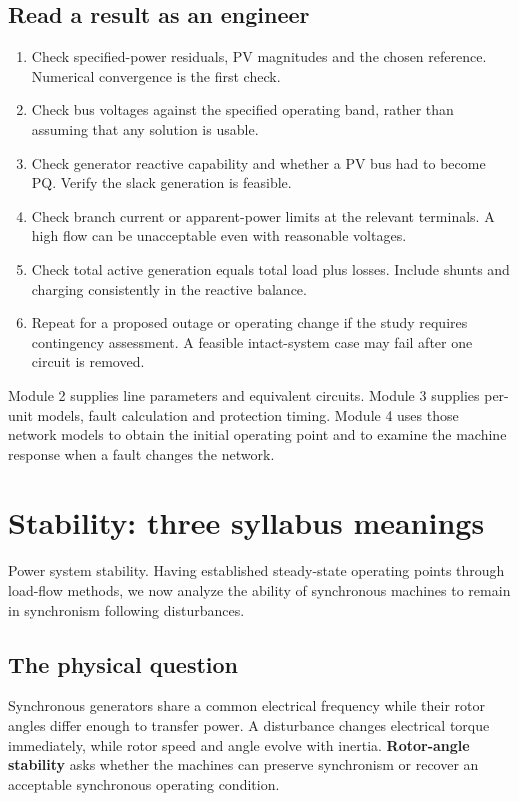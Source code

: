 \documentclass[11pt,a4paper]{article}
\newenvironment{Idea}[1]{\begin{tcolorbox}[colback=pale,colframe=teal,coltitle=white,title={#1}]}{\end{tcolorbox}}
\newcommand{\chapterstart}[2]{\par\needspace{12\baselineskip}\section{#1}\label{#2}}
\begin{document}
\subsection{Read a result as an engineer}
\begin{enumerate}
\item Check specified-power residuals, PV magnitudes and the chosen reference. Numerical convergence is the first check.
\item Check bus voltages against the specified operating band, rather than assuming that any solution is usable.
\item Check generator reactive capability and whether a PV bus had to become PQ. Verify the slack generation is feasible.
\item Check branch current or apparent-power limits at the relevant terminals. A high flow can be unacceptable even with reasonable voltages.
\item Check total active generation equals total load plus losses. Include shunts and charging consistently in the reactive balance.
\item Repeat for a proposed outage or operating change if the study requires contingency assessment. A feasible intact-system case may fail after one circuit is removed.
\end{enumerate}
\begin{Idea}{How the modules connect}
Module 2 supplies line parameters and equivalent circuits. Module 3 supplies per-unit models, fault calculation and protection timing. Module 4 uses those network models to obtain the initial operating point and to examine the machine response when a fault changes the network.
\end{Idea}

\chapterstart{Stability: three syllabus meanings}{definitions}
\textsf{Power system stability.} Having established steady-state operating points through load-flow methods, we now analyze the ability of synchronous machines to remain in synchronism following disturbances.
\subsection{The physical question}
Synchronous generators share a common electrical frequency while their rotor angles differ enough to transfer power. A disturbance changes electrical torque immediately, while rotor speed and angle evolve with inertia. \textbf{Rotor-angle stability} asks whether the machines can preserve synchronism or recover an acceptable synchronous operating condition.
\end{document}

